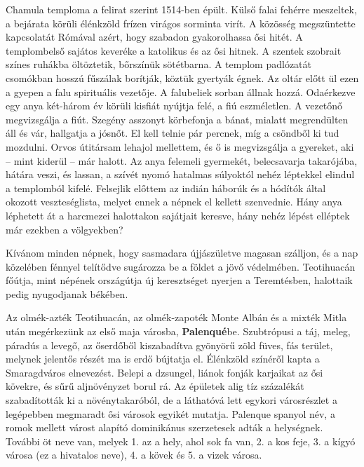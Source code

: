 Chamula temploma a felirat szerint 1514-ben épült. Külső falai
fehérre meszeltek, a bejárata körüli élénkzöld frízen virágos sorminta
virít. A közösség megszüntette kapcsolatát Rómával azért, hogy
szabadon gyakorolhassa ősi hitét. A templombelső sajátos keveréke a
katolikus és az ősi hitnek. A szentek szobrait színes ruhákba öltöztetik,
bőrszínük sötétbarna. A templom padlózatát csomókban hosszú
fűszálak borítják, köztük gyertyák égnek. Az oltár előtt ül ezen
a gyepen a falu spirituális vezetője. A falubeliek sorban állnak hozzá.
Odaérkezve egy anya két-három év körüli kisfiát nyújtja felé, a fiú
eszméletlen. A vezetőnő megvizsgálja a fiút. Szegény asszonyt körbefonja
a bánat, mialatt megrendülten áll és vár, hallgatja a jósnőt. El kell
telnie pár percnek, míg a csöndből ki tud mozdulni. Orvos útitársam
lehajol mellettem, és ő is megvizsgálja a gyereket, aki -- mint kiderül
-- már halott. Az anya felemeli gyermekét, belecsavarja takarójába, hátára
veszi, és lassan, a szívét nyomó hatalmas súlyoktól nehéz léptekkel
elindul a templomból kifelé. Felsejlik előttem az indián háborúk és a
hódítók által okozott veszteséglista, melyet ennek a népnek el kellett
szenvednie. Hány anya léphetett át a harcmezei halottakon sajátjait
keresve, hány nehéz lépést elléptek már ezekben a völgyekben?

Kívánom minden népnek, hogy sasmadara újjászületve magasan
szálljon, és a nap közelében fénnyel telítődve sugározza be a földet a jövő
védelmében. Teotihuacán főútja, mint népének országútja új keresztséget
nyerjen a Teremtésben, halottaik pedig nyugodjanak békében.


Az olmék-azték Teotihuacán, az olmék-zapoték Monte Albán és
a mixték Mitla után megérkezünk az első maja városba, \textbf{Palenqué}be.
Szubtrópusi a táj, meleg, páradús a levegő, az őserdőből kiszabadítva
gyönyörű zöld füves, fás terület, melynek jelentős részét ma is erdő
bújtatja el. Élénkzöld színéről kapta a Smaragdváros elnevezést. Belepi
a dzsungel, liánok fonják karjaikat az ősi kövekre, és sűrű aljnövényzet
borul rá. Az épületek alig tíz százalékát szabadították
ki a növénytakaróból, de a láthatóvá lett egykori városrészlet a
legépebben megmaradt ősi városok egyikét mutatja. Palenque spanyol
név, a romok mellett várost alapító dominikánus szerzetesek adták a
helységnek. További öt neve van, melyek 1. az a hely, ahol sok fa van,
2. a kos feje, 3. a kígyó városa (ez a hivatalos neve), 4. a kövek és
5. a vizek városa.

